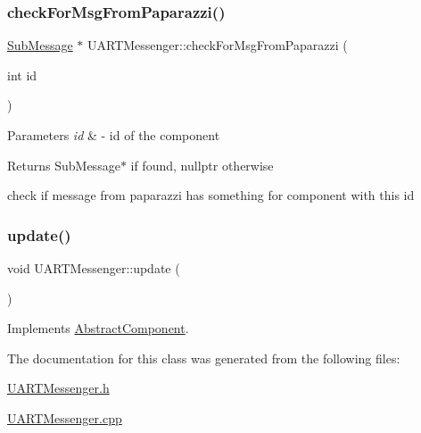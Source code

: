 \subsubsection{\texorpdfstring{check\+For\+Msg\+From\+Paparazzi()}{checkForMsgFromPaparazzi()}}
{\footnotesize\ttfamily \hyperlink{struct_sub_message}{Sub\+Message} $\ast$ U\+A\+R\+T\+Messenger\+::check\+For\+Msg\+From\+Paparazzi (\begin{DoxyParamCaption}\item[{int}]{id }\end{DoxyParamCaption})}


\begin{DoxyParams}{Parameters}
{\em id} & -\/ id of the component \\
\hline
\end{DoxyParams}
\begin{DoxyReturn}{Returns}
Sub\+Message$\ast$ if found, nullptr otherwise
\end{DoxyReturn}
check if message from paparazzi has something for component with this id \mbox{\label{class_u_a_r_t_messenger_a7f2c3bdcf3a2b082e52815b97be37281}} 
\subsubsection{\texorpdfstring{update()}{update()}}
{\footnotesize\ttfamily void U\+A\+R\+T\+Messenger\+::update (\begin{DoxyParamCaption}{ }\end{DoxyParamCaption})\hspace{0.3cm}{\ttfamily [virtual]}}



Implements \hyperlink{class_abstract_component_af25a90b8ab213762221c3b358d9873f3}{Abstract\+Component}.



The documentation for this class was generated from the following files\+:\begin{DoxyCompactItemize}
\item 
\hyperlink{_u_a_r_t_messenger_8h}{U\+A\+R\+T\+Messenger.\+h}\item 
\hyperlink{_u_a_r_t_messenger_8cpp}{U\+A\+R\+T\+Messenger.\+cpp}\end{DoxyCompactItemize}
